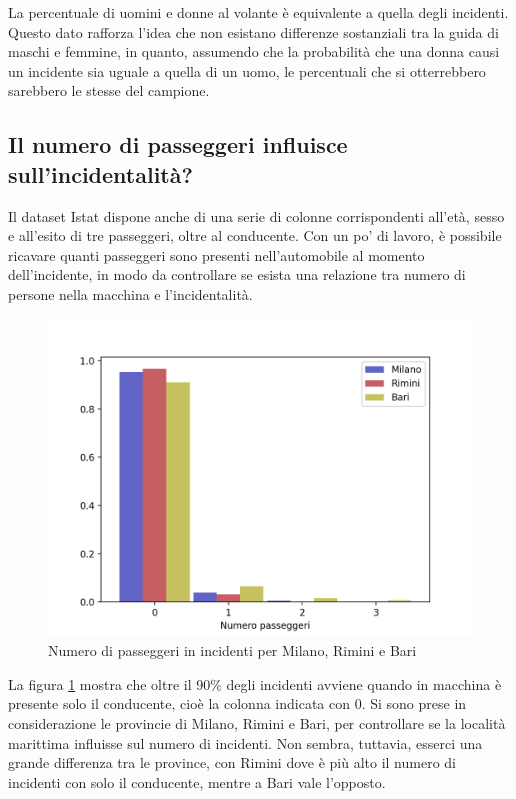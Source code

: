 \documentclass[a4paper,12pt]{report}
\begin{document}
La percentuale di uomini e donne al volante è equivalente a quella degli incidenti.
Questo dato rafforza l'idea che non esistano differenze sostanziali tra la guida di 
maschi e femmine, in quanto, assumendo che la probabilità che una donna causi un 
incidente sia uguale a quella di un uomo, le percentuali che si otterrebbero sarebbero 
le stesse del campione.

\subsection{Il numero di passeggeri influisce sull'incidentalità?}

Il dataset Istat dispone anche di una serie di colonne corrispondenti all'età, sesso e 
all'esito di tre passeggeri, oltre al conducente.
Con un po' di lavoro, è possibile ricavare quanti passeggeri sono presenti 
nell'automobile al momento dell'incidente, in modo da controllare se esista una 
relazione tra numero di persone nella macchina e l'incidentalità.

\begin{figure}
    \includegraphics[width=\linewidth]{../src/incidenti/incidenti_senza_coords/passeggeri/passeggeri.png}
    \caption{Numero di passeggeri in incidenti per Milano, Rimini e Bari}
    \label{fig:passeggeri-milano-rimini}
\end{figure}

La figura \ref{fig:passeggeri-milano-rimini} mostra che oltre il 90\% degli incidenti
avviene quando in macchina è presente solo il conducente, cioè la colonna indicata con 0.
Si sono prese in considerazione le provincie di Milano, Rimini e Bari, 
per controllare se la località marittima influisse sul numero di incidenti.
Non sembra, tuttavia, esserci una grande differenza tra le province, con Rimini dove è 
più alto il numero di incidenti con solo il conducente, mentre a Bari vale l'opposto.
\end{document}
